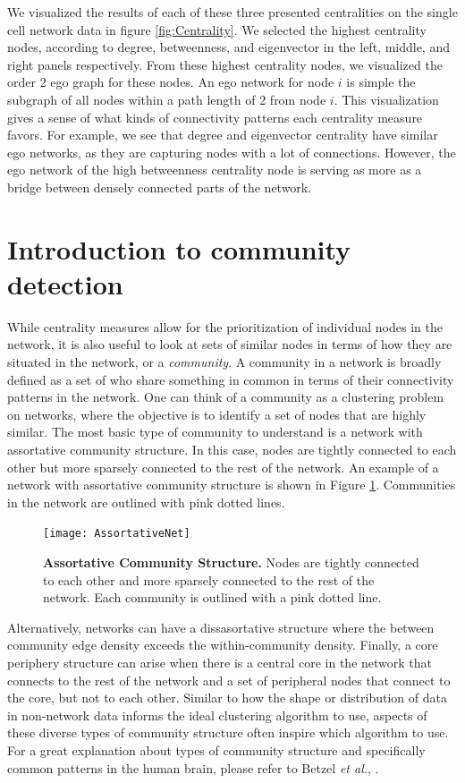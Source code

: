 \indent We visualized the results of each of these three presented centralities on the single cell network data in figure \ref{fig:Centrality}. We selected the highest centrality nodes, according to degree, betweenness, and eigenvector in the left, middle, and right panels respectively. From these highest centrality nodes, we visualized the order 2 ego graph for these nodes. An ego network for node $i$ is simple the subgraph of all nodes within a path length of 2 from node $i$. This visualization gives a sense of what kinds of connectivity patterns each centrality measure favors. For example, we see that degree and eigenvector centrality have similar ego networks, as they are capturing nodes with a lot of connections. However, the ego network of the high betweenness centrality node is serving as more as a bridge between densely connected parts of the network. 

\section{Introduction to community detection}
While centrality measures allow for the prioritization of individual nodes in the network, it is also useful to look at sets of similar nodes in terms of how they are situated in the network, or a \emph{community}. A community in a network is broadly defined as a set of who share something in common in terms of their connectivity patterns in the network. One can think of a community as a clustering problem on networks, where the objective is to identify a set of nodes that are highly similar. The most basic type of community to understand is a network with assortative community structure. In this case, nodes are tightly connected to each other but more sparsely connected to the rest of the network. An example of a network with assortative community structure is shown in Figure \ref{fig:Assort}. Communities in the network are outlined with pink dotted lines.

 \begin{figure}
\begin{center}
\texttt{[image: AssortativeNet]}
\caption{{\bf Assortative Community Structure.} Nodes are tightly connected to each other and more sparsely connected to the rest of the network. Each community is outlined with a pink dotted line.}
\label{fig:Assort}
\end{center}
\end{figure}

Alternatively, networks can have a dissasortative structure where the between community edge density exceeds the within-community density. Finally, a core periphery structure can arise when there is a central core in the network that connects to the rest of the network and a set of peripheral nodes that connect to the core, but not to each other.  Similar to how the shape or distribution of data in non-network data informs the ideal clustering algorithm to use, aspects of these diverse types of community structure often inspire which algorithm to use. For a great explanation about types of community structure and specifically common patterns in the human brain, please refer to Betzel \emph{et al.}, \cite{betzel}.  

